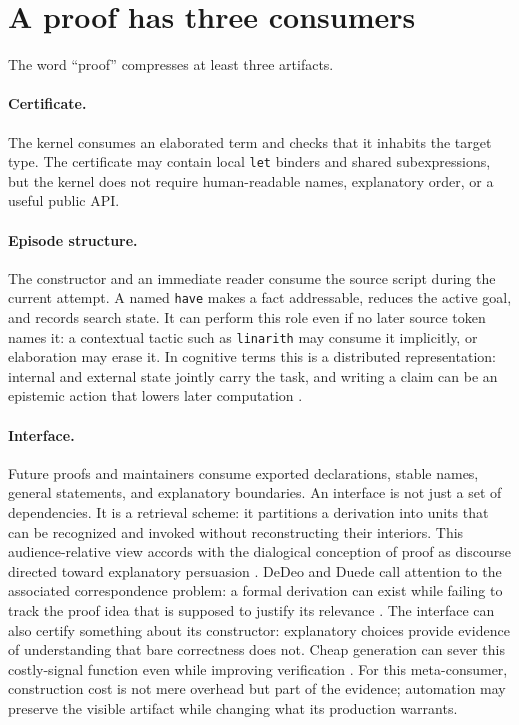 \documentclass[10pt]{article}
\newcommand{\code}[1]{\texttt{#1}}
\begin{document}
\section{A proof has three consumers}

The word ``proof'' compresses at least three artifacts.

\paragraph{Certificate.} The kernel consumes an elaborated term and checks that it inhabits the
target type.  The certificate may contain local \code{let} binders and shared subexpressions, but
the kernel does not require human-readable names, explanatory order, or a useful public API.

\paragraph{Episode structure.} The constructor and an immediate reader consume the source script
during the current attempt.  A named \code{have} makes a fact addressable, reduces the active goal,
and records search state.  It can perform this role even if no later source token names it: a
contextual tactic such as \code{linarith} may consume it implicitly, or elaboration may erase it.
In cognitive terms this is a distributed representation: internal and external state jointly carry
the task, and writing a claim can be an epistemic action that lowers later computation
\citep{zhang1994,kirsh1994}.

\paragraph{Interface.} Future proofs and maintainers consume exported declarations, stable names,
general statements, and explanatory boundaries.  An interface is not just a set of dependencies.
It is a retrieval scheme: it partitions a derivation into units that can be recognized and invoked
without reconstructing their interiors.  This audience-relative view accords with the dialogical
conception of proof as discourse directed toward explanatory persuasion \citep{dutilhnovaes2018}.
DeDeo and Duede call attention to the associated
correspondence problem: a formal derivation can exist while failing to track the proof idea that is
supposed to justify its relevance \citep{dedeo2026correspondence}.
The interface can also certify something about its constructor: explanatory choices provide
evidence of understanding that bare correctness does not.  Cheap generation can sever this
costly-signal function even while improving verification \citep{wojtowicz2025}.  For this
meta-consumer, construction cost is not mere overhead but part of the evidence; automation may
preserve the visible artifact while changing what its production warrants.
\end{document}
